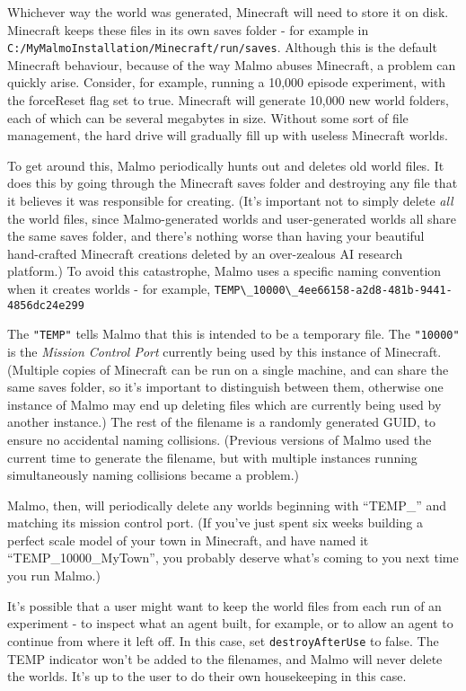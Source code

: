 \documentclass[11pt]{article} %
\begin{document}
Whichever way the world was generated, Minecraft will need to store it on disk. Minecraft keeps these files in its own saves folder - for example in \lstinline!C:/MyMalmoInstallation/Minecraft/run/saves!. Although this is the default Minecraft behaviour, because of the way Malmo abuses Minecraft, a problem can quickly arise. Consider, for example, running a 10,000 episode experiment, with the forceReset flag set to true. Minecraft will generate 10,000 new world folders, each of which can be several megabytes in size. Without some sort of file management, the hard drive will gradually fill up with useless Minecraft worlds.

To get around this, Malmo periodically hunts out and deletes old world files. It does this by going through the Minecraft saves folder and destroying any file that it believes it was responsible for creating. (It's important not to simply delete \emph{all} the world files, since Malmo-generated worlds and user-generated worlds all share the same saves folder, and there's nothing worse than having your beautiful hand-crafted Minecraft creations deleted by an over-zealous AI research platform.) To avoid this catastrophe, Malmo uses a specific naming convention when it creates worlds - for example, \lstinline!TEMP\_10000\_4ee66158-a2d8-481b-9441-4856dc24e299!

The \lstinline!"TEMP"! tells Malmo that this is intended to be a temporary file. The \lstinline!"10000"! is the \emph{Mission Control Port} currently being used by this instance of Minecraft. (Multiple copies of Minecraft can be run on a single machine, and can share the same saves folder, so it's important to distinguish between them, otherwise one instance of Malmo may end up deleting files which are currently being used by another instance.) The rest of the filename is a randomly generated GUID, to ensure no accidental naming collisions. (Previous versions of Malmo used the current time to generate the filename, but with multiple instances running simultaneously naming collisions became a problem.)

Malmo, then, will periodically delete any worlds beginning with ``TEMP\_'' and matching its mission control port. (If you've just spent six weeks building a perfect scale model of your town in Minecraft, and have named it ``TEMP\_10000\_MyTown'', you probably deserve what's coming to you next time you run Malmo.)

It's possible that a user might want to keep the world files from each run of an experiment - to inspect what an agent built, for example, or to allow an agent to continue from where it left off. In this case, set \lstinline!destroyAfterUse! to false. The TEMP indicator won't be added to the filenames, and Malmo will never delete the worlds. It's up to the user to do their own housekeeping in this case.
\end{document}
